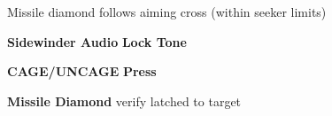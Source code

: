 \begin{checklistenumerate}
{    Missile diamond follows aiming cross (within seeker limits)

    \begin{subenumerate}[start=3]
        \item \textbf{Sidewinder Audio} \dotfill \textbf{Lock Tone}
        \item \textbf{CAGE/UNCAGE} \dotfill \textbf{Press}
        \item \textbf{Missile Diamond} \dotfill verify latched to target
    \end{subenumerate}}
\end{checklistenumerate}


\clearpage

